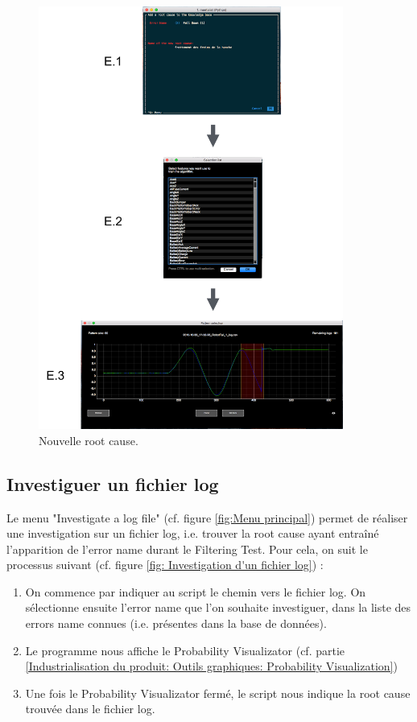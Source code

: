 \begin{figure}[H]
	\centering\includegraphics[width=10cm]{images/add_root_menu.png}
	\caption[Nouvelle root cause]{Nouvelle root cause.}
	\label{fig: Nouvelle root cause}
\end{figure} 


\subsection{Investiguer un fichier log}
\label{Industrialisation du produit: Utilisation suggérée des outils: Investiguer}
Le menu "Investigate a log file" (cf. figure \ref{fig:Menu principal}) permet de réaliser une investigation sur un fichier log, i.e. trouver la root cause ayant entraîné l'apparition de l'error name durant le Filtering Test. Pour cela, on suit le processus suivant (cf. figure \ref{fig: Investigation d'un fichier log}) : 
\begin{enumerate}
	\item On commence par indiquer au script le chemin vers le fichier log. On sélectionne ensuite l'error name que l'on souhaite investiguer, dans la liste des errors name connues (i.e. présentes dans la base de données).
	\item Le programme nous affiche le Probability Visualizator (cf. partie \ref{Industrialisation du produit: Outils graphiques: Probability Visualization})
	\item Une fois le Probability Visualizator fermé, le script nous indique la root cause trouvée dans le fichier log. 
\end{enumerate}

